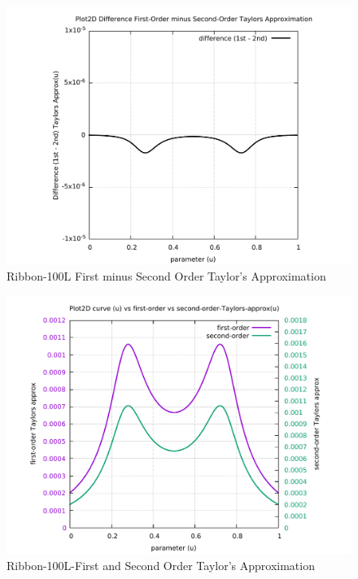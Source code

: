 \begin{figure}
	\caption     {Ribbon-100L First minus Second Order Taylor's Approximation}
	\label{06-img-Ribbon-100L-First-minus-Second-Order-Taylors-Approx.pdf}
\includegraphics[width=1.00\textwidth]{Chap4/appendix/app-Ribbon-100L/plots/06-img-Ribbon-100L-First-minus-Second-Order-Taylors-Approx.pdf}
\end{figure}

\clearpage
\pagebreak

\begin{figure}
	\caption     {Ribbon-100L-First and Second Order Taylor's Approximation}
	\label{07-img-Ribbon-100L-First-and-Second-Order-Taylors-Approx.pdf}
\includegraphics[width=1.00\textwidth]{Chap4/appendix/app-Ribbon-100L/plots/07-img-Ribbon-100L-First-and-Second-Order-Taylors-Approx.pdf}
\end{figure}



